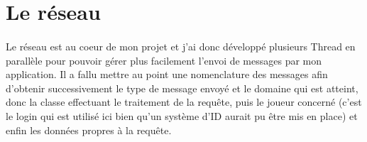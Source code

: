 \documentclass[a4paper,12pt]{report}
\begin{document}
\section{Le réseau}
\paragraph{}
Le réseau est au coeur de mon projet et j'ai donc développé plusieurs Thread en parallèle pour pouvoir gérer plus facilement l'envoi de messages par mon application.
Il a fallu mettre au point une nomenclature des messages afin d'obtenir successivement le type de message envoyé et le domaine qui est atteint, donc la classe effectuant le traitement de la requête, puis le joueur concerné (c'est le login qui est utilisé ici bien qu'un système d'ID aurait pu être mis en place) et enfin les données propres à la requête.
\end{document}
